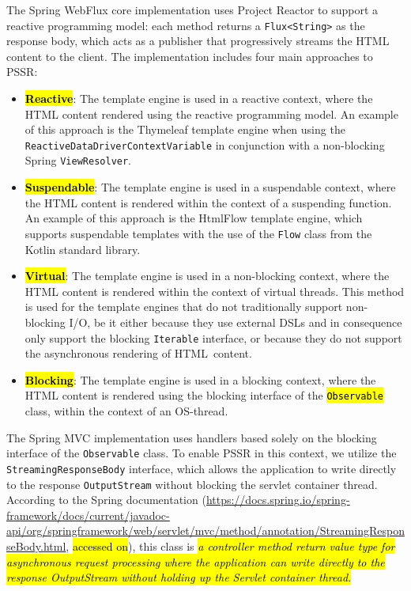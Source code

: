 \documentclass[software,article,accept,pdftex,moreauthors]{Definitions/mdpi}
\begin{document}
The Spring WebFlux core implementation uses Project Reactor to support a
reactive programming model: each method returns a \texttt{Flux<String>} as the
response body, which acts as a publisher that progressively streams the HTML
content to the client. The implementation includes four main approaches to
PSSR\@:
\begin{itemize}
      \item \textbf{\hl{Reactive}}: The template engine is used in a reactive context,
            where the HTML content rendered using the reactive programming model.
            An example of this approach is the Thymeleaf template engine
            when using the \texttt{ReactiveDataDriverContextVariable} in conjunction with a
            non-blocking Spring \texttt{ViewResolver}.
      \item \textbf{\hl{Suspendable}}: The template engine is used in a suspendable
            context, where the HTML content is rendered within the context of a suspending function.
            An example of this approach is the HtmlFlow template engine, which
            supports suspendable templates with the use of the \texttt{Flow} class from the
            Kotlin standard library.
      \item \textbf{\hl{Virtual}}: The template engine is used in a non-blocking
            context, where the HTML content is rendered within the context of virtual
            threads. This method is used for the template engines that do not traditionally
            support non-blocking I/O, be it either because they use external DSLs and in
            consequence only support the blocking \texttt{Iterable} interface, or
            because they do not support the asynchronous rendering of HTML~content.
      \item \textbf{\hl{Blocking}}: The template engine is used in a blocking
            context, where the HTML content is rendered using the blocking interface of the
            \texttt{\hl{Observable}} class, within the context of an OS-thread.
\end{itemize}

The Spring MVC implementation uses handlers based solely on the blocking
interface of the \texttt{Observable} class. To enable PSSR in this context, we
utilize the \texttt{StreamingResponseBody} interface, which allows the
application to write directly to the response \texttt{OutputStream} without
blocking the servlet container thread. According to the Spring documentation ({\url{https://docs.spring.io/spring-framework/docs/current/javadoc-api/org/springframework/web/servlet/mvc/method/annotation/StreamingResponseBody.html}}, \hl{accessed on}),
this class is \textit{\hl{a controller method return value type for asynchronous
request processing where the application can write directly to the response
OutputStream without holding up the Servlet container thread.}}
\end{document}
